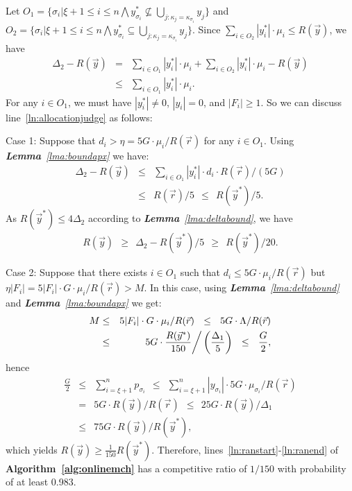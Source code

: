 \documentclass[10pt,journal,compsoc]{IEEEtran}
\begin{document}
\begin{IEEEproof} 
Let $O_1=\{\sigma_i|\xi+1\leq i\leq n \bigwedge y^*_{\sigma_i}\not\subseteq \bigcup_{j:\kappa_{j}=\kappa_{\sigma_i}}y_{j}\}$ and $O_2=\{\sigma_i|\xi+1\leq i\leq n \bigwedge y^*_{\sigma_i}\subseteq \bigcup_{j:\kappa_{j}=\kappa_{\sigma_i}}y_{j}\}$. Since $\sum\nolimits_{i\in O_2} |y^*_{i}|\cdot \mu_{i} \leq R(\vec{y})$, we have
\begin{eqnarray}
    \Delta_2-R(\vec{y}) &=& \sum_{i\in O_1} |y^*_{i}|\cdot \mu_{i}+\sum_{i\in O_2} |y^*_{i}|\cdot \mu_{i}-R(\vec{y})\nonumber\\
    &\leq& \sum\nolimits_{i\in O_1} |y^*_{i}|\cdot \mu_{i}.\nonumber
  \end{eqnarray}
For any $i\in O_1$, we must have $|y^*_i|\neq 0$, $|y_i|=0$, and $|F_i|\geq1$. So we can discuss line~\ref{ln:allocationjudge} as follows:

  Case 1: Suppose that $d_i>\eta=5G\cdot\mu_i /R(\vec{r})$  for any $i\in O_1$. Using \textit{\textbf{Lemma}~\ref{lma:boundapx}} we have:
\begin{eqnarray}
    \Delta_2-R(\vec{y}) &\leq& \sum\nolimits_{i\in O_1} |y^*_{i}|\cdot d_i \cdot {R(\vec{r})}/{(5G)}\nonumber\\
    &\leq& {R(\vec{r})}/{5}~~\leq~~R(\vec{y}^*)/5.\nonumber
    \end{eqnarray}
As $R(\vec{y}^*)\leq 4\Delta_2$ according to \textit{\textbf{Lemma}~\ref{lma:deltabound}}, we have
\begin{eqnarray}
    R(\vec{y})~~\geq~~\Delta_2 -R(\vec{y}^*)/5~~\geq~~R(\vec{y}^*)/20.\nonumber
  \end{eqnarray}

  Case 2: Suppose that there exists $i\in O_1$ such that $d_i\leq 5G\cdot\mu_i /R(\vec{r})$ but $\eta|F_i|=5|F_i|\cdot G\cdot\mu_i /R(\vec{r})>M$. In this case, using \textit{\textbf{Lemma}~\ref{lma:deltabound}} and \textit{\textbf{Lemma}~\ref{lma:boundapx}} we get:
\begin{eqnarray}
    M &\leq& 5|F_i|\cdot G\cdot\mu_i /R(\vec{r})~~\leq~~5G\cdot \Lambda /R(\vec{r})\nonumber\\
    &\leq& 5G\cdot \frac{R(\vec{y}^*)}{150}\bigg{/} \left(\frac{\Delta_1}{5}\right)~~\leq~~\frac{G}{2},
  \end{eqnarray}
hence
\begin{eqnarray}
    \frac{G}{2}&\leq& \sum_{i=\xi+1}^n p_{\sigma_i}~~\leq~~\sum_{i=\xi+1}^n |y_{\sigma_i}|\cdot 5G\cdot\mu_{\sigma_i} /R(\vec{r}) \nonumber\\
    &=& 5G\cdot R(\vec{y})/R(\vec{r})~~\leq~~25G\cdot R(\vec{y})/\Delta_1 \nonumber\\
    &\leq& 75G\cdot R(\vec{y})/R(\vec{y}^*),
  \end{eqnarray}
which yields $R(\vec{y})\geq \frac{1}{150}R(\vec{y}^*)$. Therefore, lines~\ref{ln:ranstart}-\ref{ln:ranend} of \textbf{Algorithm~\ref{alg:onlinemch}} has a competitive ratio of $1/150$ with probability of at least 0.983.
\end{IEEEproof}
\end{document}
